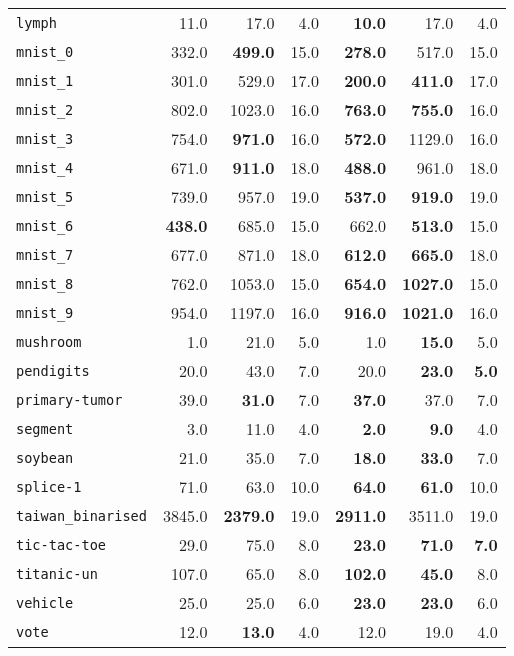 \begin{tabular}{lrrrrrr}
\texttt{lymph} & 11.0 & 17.0 & 4.0 & \textbf{10.0} & 17.0 & 4.0\\
\texttt{mnist\_0} & 332.0 & \textbf{499.0} & 15.0 & \textbf{278.0} & 517.0 & 15.0\\
\texttt{mnist\_1} & 301.0 & 529.0 & 17.0 & \textbf{200.0} & \textbf{411.0} & 17.0\\
\texttt{mnist\_2} & 802.0 & 1023.0 & 16.0 & \textbf{763.0} & \textbf{755.0} & 16.0\\
\texttt{mnist\_3} & 754.0 & \textbf{971.0} & 16.0 & \textbf{572.0} & 1129.0 & 16.0\\
\texttt{mnist\_4} & 671.0 & \textbf{911.0} & 18.0 & \textbf{488.0} & 961.0 & 18.0\\
\texttt{mnist\_5} & 739.0 & 957.0 & 19.0 & \textbf{537.0} & \textbf{919.0} & 19.0\\
\texttt{mnist\_6} & \textbf{438.0} & 685.0 & 15.0 & 662.0 & \textbf{513.0} & 15.0\\
\texttt{mnist\_7} & 677.0 & 871.0 & 18.0 & \textbf{612.0} & \textbf{665.0} & 18.0\\
\texttt{mnist\_8} & 762.0 & 1053.0 & 15.0 & \textbf{654.0} & \textbf{1027.0} & 15.0\\
\texttt{mnist\_9} & 954.0 & 1197.0 & 16.0 & \textbf{916.0} & \textbf{1021.0} & 16.0\\
\texttt{mushroom} & 1.0 & 21.0 & 5.0 & 1.0 & \textbf{15.0} & 5.0\\
\texttt{pendigits} & 20.0 & 43.0 & 7.0 & 20.0 & \textbf{23.0} & \textbf{5.0}\\
\texttt{primary-tumor} & 39.0 & \textbf{31.0} & 7.0 & \textbf{37.0} & 37.0 & 7.0\\
\texttt{segment} & 3.0 & 11.0 & 4.0 & \textbf{2.0} & \textbf{9.0} & 4.0\\
\texttt{soybean} & 21.0 & 35.0 & 7.0 & \textbf{18.0} & \textbf{33.0} & 7.0\\
\texttt{splice-1} & 71.0 & 63.0 & 10.0 & \textbf{64.0} & \textbf{61.0} & 10.0\\
\texttt{taiwan\_binarised} & 3845.0 & \textbf{2379.0} & 19.0 & \textbf{2911.0} & 3511.0 & 19.0\\
\texttt{tic-tac-toe} & 29.0 & 75.0 & 8.0 & \textbf{23.0} & \textbf{71.0} & \textbf{7.0}\\
\texttt{titanic-un} & 107.0 & 65.0 & 8.0 & \textbf{102.0} & \textbf{45.0} & 8.0\\
\texttt{vehicle} & 25.0 & 25.0 & 6.0 & \textbf{23.0} & \textbf{23.0} & 6.0\\
\texttt{vote} & 12.0 & \textbf{13.0} & 4.0 & 12.0 & 19.0 & 4.0\\

\end{tabular}
